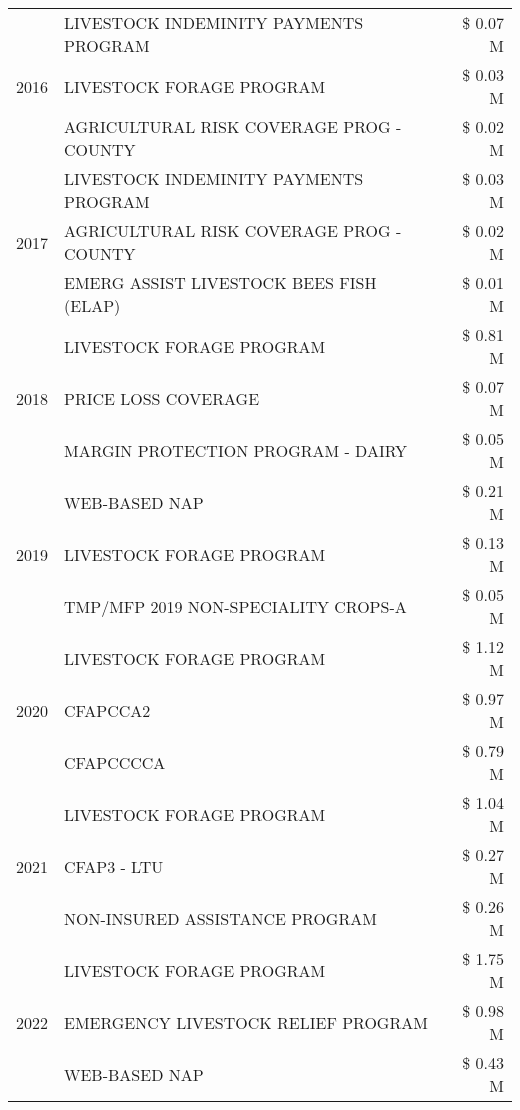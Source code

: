 \begin{tabular}{llr}
\cline{1-3}
\multirow[t]{3}{*}{2016} & LIVESTOCK INDEMINITY PAYMENTS PROGRAM & \$ 0.07 M \\
 & LIVESTOCK FORAGE PROGRAM & \$ 0.03 M \\
 & AGRICULTURAL RISK COVERAGE PROG - COUNTY & \$ 0.02 M \\
\cline{1-3}
\multirow[t]{3}{*}{2017} & LIVESTOCK INDEMINITY PAYMENTS PROGRAM & \$ 0.03 M \\
 & AGRICULTURAL RISK COVERAGE PROG - COUNTY & \$ 0.02 M \\
 & EMERG ASSIST LIVESTOCK BEES FISH (ELAP) & \$ 0.01 M \\
\cline{1-3}
\multirow[t]{3}{*}{2018} & LIVESTOCK FORAGE PROGRAM & \$ 0.81 M \\
 & PRICE LOSS COVERAGE & \$ 0.07 M \\
 & MARGIN PROTECTION PROGRAM - DAIRY & \$ 0.05 M \\
\cline{1-3}
\multirow[t]{3}{*}{2019} & WEB-BASED NAP & \$ 0.21 M \\
 & LIVESTOCK FORAGE PROGRAM & \$ 0.13 M \\
 & TMP/MFP 2019 NON-SPECIALITY CROPS-A & \$ 0.05 M \\
\cline{1-3}
\multirow[t]{3}{*}{2020} & LIVESTOCK FORAGE PROGRAM & \$ 1.12 M \\
 & CFAPCCA2 & \$ 0.97 M \\
 & CFAPCCCCA & \$ 0.79 M \\
\cline{1-3}
\multirow[t]{3}{*}{2021} & LIVESTOCK FORAGE PROGRAM & \$ 1.04 M \\
 & CFAP3 - LTU & \$ 0.27 M \\
 & NON-INSURED ASSISTANCE PROGRAM & \$ 0.26 M \\
\cline{1-3}
\multirow[t]{3}{*}{2022} & LIVESTOCK FORAGE PROGRAM & \$ 1.75 M \\
 & EMERGENCY LIVESTOCK RELIEF PROGRAM & \$ 0.98 M \\
 & WEB-BASED NAP & \$ 0.43 M \\
\cline{1-3}
\bottomrule
\end{tabular}

